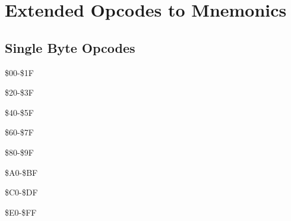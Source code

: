 \chapter{Extended Opcodes to Mnemonics}
\section{Single Byte Opcodes}
\begin{table}[h]\centering\scriptsize
  \caption{\$00-\$1F}
\end{table}
\begin{table}[h]\centering\scriptsize
  \caption{\$20-\$3F}
\end{table}
\begin{table}[h]\centering\scriptsize
  \caption{\$40-\$5F}
\end{table}
\begin{table}[h]\centering\scriptsize
  \caption{\$60-\$7F}
\end{table}
\begin{table}[h]\centering\scriptsize
  \caption{\$80-\$9F}
\end{table}
\begin{table}[h]\centering\scriptsize
  \caption{\$A0-\$BF}
\end{table}
\begin{table}[h]\centering\scriptsize
  \caption{\$C0-\$DF}
\end{table}
\begin{table}[h]\centering\scriptsize
  \caption{\$E0-\$FF}
\end{table}
